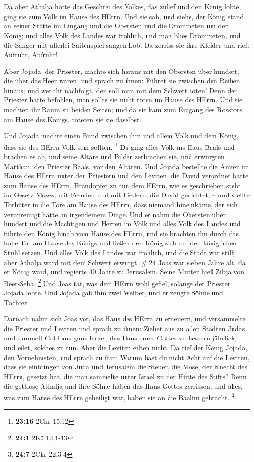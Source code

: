  Da aber Athalja hörte das Geschrei des Volkes, das zulief
und den König lobte, ging sie zum Volk im Hause des HErrn. 
Und sie sah, und siehe, der König stand an seiner Stätte im Eingang und
die Obersten und die Drommeten um den König; und alles Volk des Landes
war fröhlich, und man blies Drommeten, und die Sänger mit allerlei
Saitenspiel sangen Lob. Da zerriss sie ihre Kleider und rief: Aufruhr,
Aufruhr!

 Aber Jojada, der Priester, machte sich heraus mit den
Obersten über hundert, die über das Heer waren, und sprach zu ihnen:
Führet sie zwischen den Reihen hinaus; und wer ihr nachfolgt, den soll
man mit dem Schwert töten! Denn der Priester hatte befohlen, man sollte
sie nicht töten im Hause des HErrn.  Und sie machten ihr
Raum zu beiden Seiten; und da sie kam zum Eingang des Rosstors am Hause
des Königs, töteten sie sie daselbst.

 Und Jojada machte einen Bund zwischen ihm und allem Volk
und dem König, dass sie des HErrn Volk sein sollten. \footnote{\textbf{23:16}
  2Chr 15,12}  Da ging alles Volk ins Haus Baals und
brachen es ab, und seine Altäre und Bilder zerbrachen sie, und erwürgten
Matthan, den Priester Baals, vor den Altären.  Und Jojada
bestellte die Ämter im Hause des HErrn unter den Priestern und den
Leviten, die David verordnet hatte zum Hause des HErrn, Brandopfer zu
tun dem HErrn, wie es geschrieben steht im Gesetz Moses, mit Freuden und
mit Liedern, die David gedichtet, --  und stellte Torhüter
in die Tore am Hause des HErrn, dass niemand hineinkäme, der sich
verunreinigt hätte an irgendeinem Dinge.  Und er nahm die
Obersten über hundert und die Mächtigen und Herren im Volk und alles
Volk des Landes und führte den König hinab vom Hause des HErrn, und sie
brachten ihn durch das hohe Tor am Hause des Königs und ließen den König
sich auf den königlichen Stuhl setzen.  Und alles Volk des
Landes war fröhlich, und die Stadt war still; aber Athalja ward mit dem
Schwert erwürgt. \# 24  Joas war sieben Jahre alt, da er
König ward, und regierte 40 Jahre zu Jerusalem. Seine Mutter hieß Zibja
von Beer-Seba. \footnote{\textbf{24:1} 2Kö 12,1-13}  Und
Joas tat, was dem HErrn wohl gefiel, solange der Priester Jojada lebte.
 Und Jojada gab ihm zwei Weiber, und er zeugte Söhne und
Töchter.

 Darnach nahm sich Joas vor, das Haus des HErrn zu erneuern,
 und versammelte die Priester und Leviten und sprach zu
ihnen: Ziehet aus zu allen Städten Judas und sammelt Geld aus ganz
Israel, das Haus eures Gottes zu bessern jährlich, und eilet, solches zu
tun. Aber die Leviten eilten nicht.  Da rief der König
Jojada, den Vornehmsten, und sprach zu ihm: Warum hast du nicht Acht auf
die Leviten, dass sie einbringen von Juda und Jerusalem die Steuer, die
Mose, der Knecht des HErrn, gesetzt hat, die man sammelte unter Israel
zu der Hütte des Stifts?  Denn die gottlose Athalja und ihre
Söhne haben das Haus Gottes zerrissen, und alles, was zum Hause des
HErrn geheiligt war, haben sie an die Baalim gebracht. \footnote{\textbf{24:7}
  2Chr 22,3-4}

